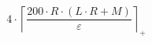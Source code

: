 \[4 \cdot \left\lceil \frac{200 \cdot R \cdot \left(L \cdot R + M\right)}{\varepsilon} \right\rceil_{+}\]
